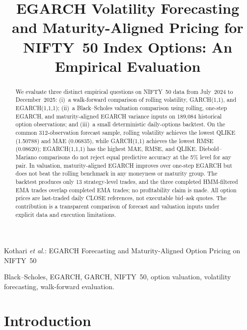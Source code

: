 \documentclass[journal]{IEEEtran}
\begin{document}
\title{EGARCH Volatility Forecasting and Maturity-Aligned Pricing for NIFTY~50 Index Options: An Empirical Evaluation}

\author{
\IEEEauthorblockA{}
}

\markboth{}%
{Kothari \MakeLowercase{\textit{et al.}}: EGARCH Forecasting and Maturity-Aligned Option Pricing on NIFTY~50}

\maketitle

\begin{abstract}
We evaluate three distinct empirical questions on NIFTY~50 data from July~2024 to December~2025: (i)~a walk-forward comparison of rolling volatility, GARCH(1,1), and EGARCH(1,1,1); (ii)~a Black--Scholes valuation comparison using rolling, one-step EGARCH, and maturity-aligned EGARCH variance inputs on 189{,}084 historical option observations; and (iii)~a small deterministic daily-options backtest. On the common 312-observation forecast sample, rolling volatility achieves the lowest QLIKE (1.50788) and MAE (0.06835), while GARCH(1,1) achieves the lowest RMSE (0.08620); EGARCH(1,1,1) has the highest MAE, RMSE, and QLIKE. Diebold--Mariano comparisons do not reject equal predictive accuracy at the 5\% level for any pair. In valuation, maturity-aligned EGARCH improves over one-step EGARCH but does not beat the rolling benchmark in any moneyness or maturity group. The backtest produces only 13 strategy-level trades, and the three completed HMM-filtered EMA trades overlap completed EMA trades; no profitability claim is made. All option prices are last-traded daily CLOSE references, not executable bid--ask quotes. The contribution is a transparent comparison of forecast and valuation inputs under explicit data and execution limitations.
\end{abstract}

\begin{IEEEkeywords}
Black--Scholes, EGARCH, GARCH, NIFTY~50, option valuation, volatility forecasting, walk-forward evaluation.
\end{IEEEkeywords}

\IEEEpeerreviewmaketitle

\section{Introduction}
\end{document}
